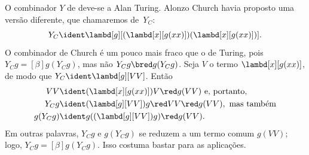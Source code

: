 \documentclass[../../../include/open-logic-section]{subfiles}
\begin{document}
O combinador $Y$ de  deve-se a Alan
Turing. Alonzo Church havia proposto uma versão diferente, que chamaremos
de~$Y_C$:
\[
Y_C \ident \lambd[g][(\lambd[x][g(xx)])(\lambd[x][g(xx)])].
\]
O combinador de Church é um pouco mais fraco que o de Turing, pois $Y_C g
\equal[\beta] g(Y_C g)$, mas não $Y_C g \bred g(Y_C g)$. Seja $V$ o termo
$\lambd[x][g(xx)]$, de modo que $Y_C \ident \lambd[g][VV]$. Então
\begin{align*}
  VV & \ident (\lambd[x][g(xx)])V \red g(VV)
  \text{ e, portanto,}\\
  Y_C g & \ident (\lambd[g][VV])g \red VV \red g(VV), \text{ mas também}\\
  g(Y_C g) & \ident g((\lambd[g][VV])g) \red g(VV).
\end{align*}
Em outras palavras, $Y_C g$ e $g(Y_C g)$ se reduzem a um termo comum
$g(VV)$; logo, $Y_C g \equal[\beta] g(Y_C g)$. Isso costuma bastar para
as aplicações.
\end{document}
